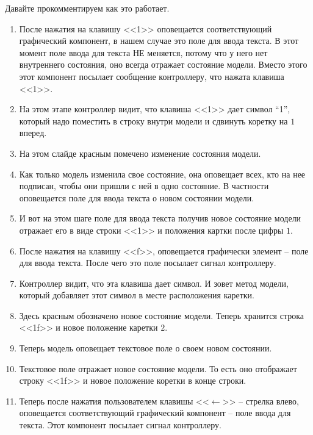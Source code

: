 Давайте прокомментируем как это работает.
\begin{enumerate}
\item После нажатия на клавишу <<1>> оповещается соответствующий графический компонент, в нашем случае это поле для ввода текста.
В этот момент поле ввода для текста НЕ меняется, потому что у него нет внутреннего состояния, оно всегда отражает состояние модели.
Вместо этого этот компонент посылает сообщение контроллеру, что нажата клавиша <<1>>.

\item На этом этапе контроллер видит, что клавиша <<1>> дает символ ``1'', который надо поместить в строку внутри модели и сдвинуть коретку на $1$ вперед.

\item На этом слайде красным помечено изменение состояния модели.

\item Как только модель изменила свое состояние, она оповещает всех, кто на нее подписан, чтобы они пришли с ней в одно состояние.
В частности оповещается поле для ввода текста о новом состоянии модели.

\item И вот на этом шаге поле для ввода текста получив новое состояние модели отражает его в виде строки <<1>> и положения картки после цифры $1$.

\item После нажатия на клавишу <<f>>, оповещается графически элемент -- поле для ввода текста.
После чего это поле посылает сигнал контроллеру.

\item Контроллер видит, что эта клавиша дает символ.
И зовет метод модели, который добавляет этот символ в месте расположения каретки.

\item Здесь красным обозначено новое состояние модели.
Теперь хранится строка <<1f>> и новое положение каретки $2$.

\item Теперь модель оповещает текстовое поле о своем новом состоянии.

\item Текстовое поле отражает новое состояние модели.
То есть оно отображает строку <<1f>> и новое положение коретки в конце строки.

\item Теперь после нажатия пользователем клавишы <<$\leftarrow$>> -- стрелка влево, оповещается соответствующий графический компонент -- поле ввода для текста.
Этот компонент посылает сигнал контроллеру.


\end{enumerate}
